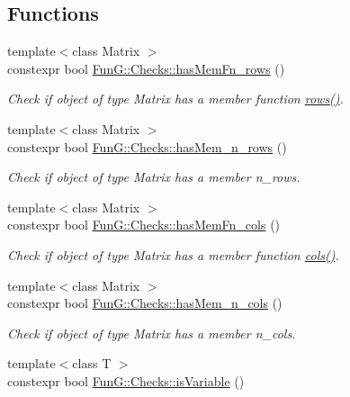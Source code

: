 \subsection*{\-Functions}
\begin{DoxyCompactItemize}
\item 
{\footnotesize template$<$class Matrix $>$ }\\constexpr bool \hyperlink{group__ConceptCheck_ga68fd30eff9d106c399b2b0e9a1f1b822}{\-Fun\-G\-::\-Checks\-::has\-Mem\-Fn\-\_\-rows} ()
\begin{DoxyCompactList}\small\item\em \-Check if object of type \-Matrix has a member function \hyperlink{namespaceFunG_1_1LinearAlgebra_abd3afa2fcd2194787342b2662cfa9f5a}{rows()}. \end{DoxyCompactList}\item 
{\footnotesize template$<$class Matrix $>$ }\\constexpr bool \hyperlink{group__ConceptCheck_ga6f66adbc63ed46140f1080e9914cb5de}{\-Fun\-G\-::\-Checks\-::has\-Mem\-\_\-n\-\_\-rows} ()
\begin{DoxyCompactList}\small\item\em \-Check if object of type \-Matrix has a member n\-\_\-rows. \end{DoxyCompactList}\item 
{\footnotesize template$<$class Matrix $>$ }\\constexpr bool \hyperlink{group__ConceptCheck_ga4979df2d7b7abebb0253a569e41274b1}{\-Fun\-G\-::\-Checks\-::has\-Mem\-Fn\-\_\-cols} ()
\begin{DoxyCompactList}\small\item\em \-Check if object of type \-Matrix has a member function \hyperlink{namespaceFunG_1_1LinearAlgebra_ae981b8bee32eea3ce87f41874835c9c1}{cols()}. \end{DoxyCompactList}\item 
{\footnotesize template$<$class Matrix $>$ }\\constexpr bool \hyperlink{group__ConceptCheck_ga0a87aaa714499abcaabd921297be61e4}{\-Fun\-G\-::\-Checks\-::has\-Mem\-\_\-n\-\_\-cols} ()
\begin{DoxyCompactList}\small\item\em \-Check if object of type \-Matrix has a member n\-\_\-cols. \end{DoxyCompactList}\item 
{\footnotesize template$<$class T $>$ }\\constexpr bool \hyperlink{group__ConceptCheck_gac2a1a8aedf54c42cb6d47b3b64bbc761}{\-Fun\-G\-::\-Checks\-::is\-Variable} ()

\end{DoxyCompactItemize}
